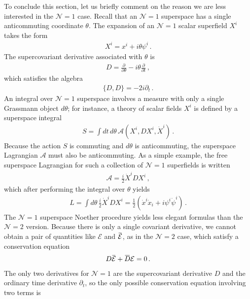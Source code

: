 \documentclass[12pt]{article}
\numberwithin{equation}{section}
\newcommand{\overbar}[1]{\mkern 1.5mu\overline{\mkern-1.5mu#1\mkern-1.5mu}\mkern 1.5mu}
\newcommand{\Dbar}{\overbar{D}}
\def\cEb{{\overbar{\mathcal{E}}}}
\def\cE{{\mathcal{E}}}
\begin{document}
To conclude this section, let us briefly comment on the reason we are less interested in the $\mathcal{N} = 1$ case. Recall that an $\mathcal{N} = 1$ superspace has a single anticommuting coordinate $\theta$. The expansion of an $\mathcal{N} = 1$ scalar superfield $X^i$ takes the form
%
\begin{align}
    X^i = x^i + i \theta \psi^i \, .
\end{align}
%
The supercovariant derivative associated with $\theta$ is
%
\begin{align}
    D = \frac{\partial}{\partial \theta} - i \theta \frac{\partial}{\partial t} \, ,
\end{align}
%
which satisfies the algebra
%
\begin{align}
    \{ D , D \} = - 2 i \partial_t \, .
\end{align}
%
An integral over $\mathcal{N} = 1$ superspace involves a measure with only a single Grassmann object $d \theta$; for instance, a theory of scalar fields $X^i$ is defined by a superspace integral
%
\begin{align}
    S = \int dt \, d \theta \, \mathcal{A} \left( X^i , DX^i , \dot{X}^i \right) \, .
\end{align}
%
Because the action $S$ is commuting and $d \theta$ is anticommuting, the superspace Lagrangian $\mathcal{A}$ must also be anticommuting. As a simple example, the free superspace Lagrangian for such a collection of $\mathcal{N} = 1$ superfields is written
%
\begin{align}\label{example_n_equals_one_free}
    \mathcal{A} = \frac{i}{2} \dot{X}^i D X^i \, ,
\end{align}
%
which after performing the integral over $\theta$ yields
%
\begin{align}
    L = \int d \theta \,  \frac{i}{2} \dot{X}^i D X^i = \frac{1}{2} \left( \dot{x}^i \dot{x}_i + i \psi^i \dot{\psi}^i \right) \, .
\end{align}
%
The $\mathcal{N} = 1$ superspace Noether procedure yields less elegant formulas than the $\mathcal{N} = 2$ version. Because there is only a single covariant derivative, we cannot obtain a pair of quantities like $\cE$ and $\cEb$, as in the $\mathcal{N} = 2$ case, which satisfy a conservation equation
%
\begin{align}
    D \cEb + \Dbar \cE = 0 \, .
\end{align}
%
The only two derivatives for $\mathcal{N} = 1$ are the supercovariant derivative $D$ and the ordinary time derivative $\partial_t$, so the only possible conservation equation involving two terms is
\end{document}
